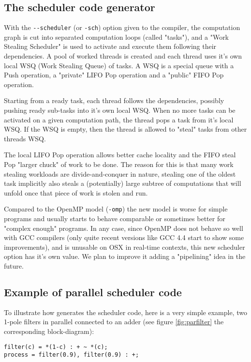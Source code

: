 \subsection{The scheduler code generator}
 With the \lstinline!--scheduler! (or \lstinline!-sch!) option given to the \faust compiler, the computation graph is cut into separated computation loops (called "tasks"), and a "Work Stealing Scheduler" is used to activate and execute them following their dependencies. A pool of worked threads is created and each thread uses it's own local WSQ (Work Stealing Queue) of tasks. A WSQ is a special queue with a Push operation, a "private" LIFO Pop operation and a "public" FIFO Pop operation.

Starting from a ready task, each thread follows the dependencies, possibly pushing ready sub-tasks into it's own local WSQ. When no more tasks can be activated on a given computation path, the thread pops a task from it's local WSQ. If the WSQ is empty, then the thread is allowed to "steal" tasks from other threads WSQ.

The local LIFO Pop operation allows better cache locality and the FIFO steal Pop "larger chuck" of work to be done. The reason for this is that many work stealing workloads are divide-and-conquer in nature, stealing one of the oldest task implicitly also steals a (potentially) large subtree of computations that will unfold once that piece of work is stolen and run.

Compared to the OpenMP model (\lstinline!-omp!) the new model is worse for simple \faust  programs and usually starts to behave comparable or sometimes better for "complex enough" \faust  programs. In any case, since OpenMP does not behave so well with GCC compilers (only quite recent versions like GCC 4.4 start to show some improvements), and is unusable on OSX in real-time contexts, this new scheduler option has it's own value.  We plan to improve it adding a "pipelining" idea in the future.

\subsection{Example of parallel scheduler code}
To illustrate how \faust generates the scheduler code, here is a very simple example, two 1-pole filters in parallel connected to an adder (see figure \ref{fig:parfilter} the corresponding block-diagram):

\begin{lstlisting}
filter(c) = *(1-c) : + ~ *(c);
process = filter(0.9), filter(0.9) : +; 
\end{lstlisting}


